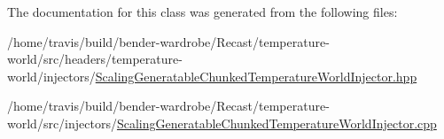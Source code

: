 The documentation for this class was generated from the following files\-:\begin{DoxyCompactItemize}
\item 
/home/travis/build/bender-\/wardrobe/\-Recast/temperature-\/world/src/headers/temperature-\/world/injectors/\hyperlink{_scaling_generatable_chunked_temperature_world_injector_8hpp}{Scaling\-Generatable\-Chunked\-Temperature\-World\-Injector.\-hpp}\item 
/home/travis/build/bender-\/wardrobe/\-Recast/temperature-\/world/src/injectors/\hyperlink{_scaling_generatable_chunked_temperature_world_injector_8cpp}{Scaling\-Generatable\-Chunked\-Temperature\-World\-Injector.\-cpp}\end{DoxyCompactItemize}
